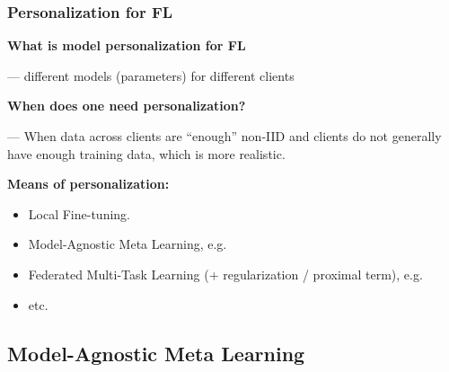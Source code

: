 \begin{frame}
\frametitle{Personalization for FL}

{\bfseries What is model personalization for FL}

\vspace{0.2em}

\noindent --- different models (parameters) for different clients

\pause
\vspace{0.6em}

{\bfseries When does one need personalization?}

\vspace{0.2em}

\noindent --- When data across clients are ``enough'' non-IID and clients do not generally have enough training data, which is more realistic.

\pause
\vspace{0.6em}

{\bfseries Means of personalization:}
\begin{itemize}
    \item Local Fine-tuning.
    \item Model-Agnostic Meta Learning, e.g. \cite{finn2017maml}
    \item Federated Multi-Task Learning (+ regularization / proximal term), e.g. \cite{smith2017mocha}
    \item etc.
\end{itemize}

\end{frame}


\subsection[MAML]{Model-Agnostic Meta Learning}


